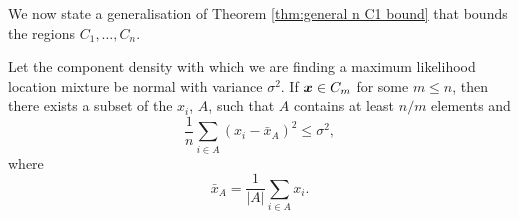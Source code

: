 	
	We now state a generalisation of Theorem \ref{thm:general n C1 bound} that bounds the regions $C_1, \dots, C_n$.

	\label{sec:bounding Cm}
		\begin{theorem}
			Let the component density with which we are finding a maximum likelihood location mixture be normal with variance $\sigma^2$. If ${\bm{{x}}} \in C_m$ for some $m \leq n$, then there exists a subset of the $x_i$, $A$, such that $A$ contains at least $n/m$ elements and
			\begin{equation}
				\frac{1}{n} \sum_{i \in A} \left(x_i - \bar{x}_A\right)^2 \leq \sigma^2,
			\end{equation}
			where
			\begin{equation}
				\bar{x}_A = \frac{1}{|A|}\sum_{i \in A} x_i.
			\end{equation}
			\label{thm:general n constraints result}
		\end{theorem}
